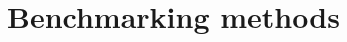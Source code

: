 \chapter{Benchmarking methods}

\ifpdf
    \graphicspath{{Chapter3/Figs/Raster/}{Chapter3/Figs/PDF/}{Chapter3/Figs/}}
\else
    \graphicspath{{Chapter3/Figs/Vector/}{Chapter3/Figs/}}
\fi
